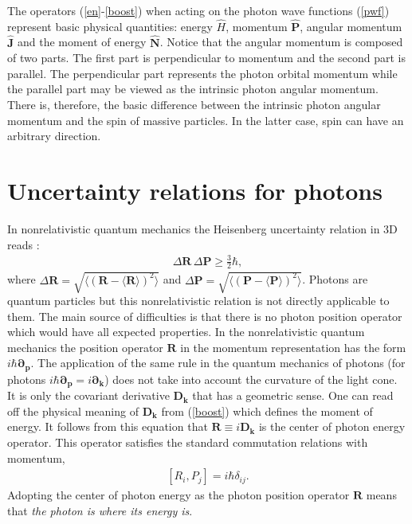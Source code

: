 \documentclass[onecolumn,aps,pra,12pt]{revtex4-1}
\begin{document}
The operators (\ref{en}-\ref{boost}) when acting on the photon wave functions (\ref{pwf}) represent basic physical quantities: energy ${\hat H}$, momentum ${\hat{\bm P}}$, angular momentum ${\hat{\bm J}}$ and the moment of energy ${\hat{\bm N}}$. Notice that the angular momentum is composed of two parts. The first part is perpendicular to momentum and the second part is parallel. The perpendicular part represents the photon orbital momentum while the parallel part may be viewed as the intrinsic photon angular momentum. There is, therefore, the basic difference between the intrinsic photon angular momentum and the spin of massive particles. In the latter case, spin can have an arbitrary direction.

\section{Uncertainty relations for photons}

In nonrelativistic quantum mechanics the Heisenberg uncertainty relation in 3D reads :
\begin{align}\label{hur}
\Delta{\bm R}\,\Delta{\bm P}\ge\frac{3}{2}\hbar,
\end{align}
where $\Delta{\bm R}=\sqrt{\langle({\bm R}-\langle{\bm R}\rangle)^2\rangle}$ and $\Delta{\bm P}=\sqrt{\langle({\bm P}-\langle{\bm P}\rangle)^2\rangle}$.
Photons are quantum particles but this nonrelativistic relation is not directly applicable to them. The main source of difficulties is that there is no photon position operator which would have all expected properties. In the nonrelativistic quantum mechanics the position operator ${\bm R}$ in the momentum representation has the form $i\hbar{\bm{\partial}_{\bm p}}$. The application of the same rule in the quantum mechanics of photons (for photons $i\hbar{\bm{\partial}}_{\bm p}=i{\bm{\partial}}_{\bm k}$) does not take into account the curvature of the light cone. It is only the covariant derivative ${\bm D}_{\bm k}$ that has a geometric sense. One can read off the physical meaning of ${\bm D}_{\bm k}$ from (\ref{boost}) which defines the moment of energy. It follows from this equation that ${\bm R}\equiv i{\bm D}_{\bm k}$ is the center of photon energy operator. This operator satisfies the standard commutation relations with momentum,
\begin{align}\label{crel}
[R_i,P_j]=i\hbar\delta_{ij}.
\end{align}
Adopting the center of photon energy as the photon position operator ${\bm R}$ means that {\em the photon is where its energy is}.
\end{document}
